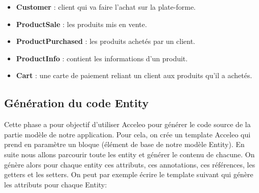 \begin{itemize}
  \item[\textbullet] \textbf{Customer} :  client qui va faire l'achat sur la plate-forme.
  \item[\textbullet] \textbf{ProductSale} : les produits mis en vente.
  \item[\textbullet] \textbf{ProductPurchased} : les produits achetés par un client.
  \item[\textbullet] \textbf{ProductInfo} : contient les informations d'un produit.
  \item[\textbullet] \textbf{Cart} : une carte de paiement reliant un client aux produits qu'il a achetés.   
\end{itemize}

\subsection{Génération du code Entity}
Cette phase a pour objectif d'utiliser Acceleo pour générer le code source de la partie modèle de notre application.
Pour cela, on crée un template Acceleo qui prend en paramètre un bloque (élément de base de notre modèle Entity). En suite nous allons parcourir toute les entity et générer le contenu de chacune. On génère alors pour chaque entity ces attributs, ces annotations, ces références, les getters et les setters. On peut par exemple écrire le template suivant qui génère les attributs pour chaque Entity: \\




